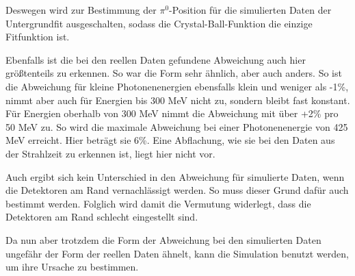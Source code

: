 \documentclass[a4paper,11pt,oneside,final,german,openbib,pdftex]{scrbook}
\begin{document}
{Deswegen wird zur Bestimmung der $\pi^0$-Position f\"ur die simulierten Daten der Untergrundfit ausgeschalten, sodass die Crystal-Ball-Funktion die einzige Fitfunktion ist.

Ebenfalls ist die bei den reellen Daten gefundene Abweichung auch hier größtenteils zu erkennen. So war die Form sehr ähnlich, aber auch anders. So ist die Abweichung f\"ur kleine Photonenenergien ebensfalls klein und weniger als -1\%, nimmt aber auch f\"ur Energien bis 300 MeV nicht zu, sondern bleibt fast konstant. F\"ur Energien oberhalb von 300 MeV nimmt die Abweichung mit \"uber +2\% pro 50 MeV zu. So wird die maximale Abweichung bei einer Photonenenergie von 425 MeV erreicht. Hier betr\"agt sie 6\%. Eine Abflachung, wie sie bei den Daten aus der Strahlzeit zu erkennen ist, liegt hier nicht vor.

Auch ergibt sich kein Unterschied in den Abweichung für simulierte Daten, wenn die Detektoren am Rand vernachlässigt werden. So muss dieser Grund dafür auch bestimmt werden. Folglich wird damit die Vermutung widerlegt, dass die Detektoren am Rand schlecht eingestellt sind.



Da nun aber trotzdem die Form der Abweichung bei den simulierten Daten ungefähr der Form der reellen Daten ähnelt, kann die Simulation benutzt werden, um ihre Ursache zu bestimmen.


}
\end{document}
